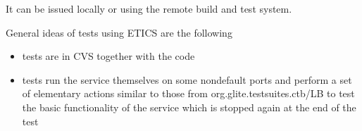 It can be issued locally or using the remote build and test system.

General ideas of \LB tests using ETICS are the following

\begin{itemize}
\item tests are in CVS together with the code

\item tests run the service themselves on some nondefault ports and perform a set of 
elementary actions similar to those from org.glite.testsuites.ctb/LB
to test the basic functionality of the service which is stopped again at the 
end of the test

\end{itemize} 

